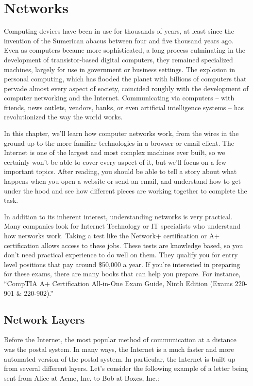 \chapter{Networks}

Computing devices have been in use for thousands of years, at least since the invention of the Sumerican abacus between four and five thousand years ago. Even as computers became more sophisticated, a long process culminating in the development of transistor-based digital computers, they remained specialized machines, largely for use in government or business settings. The explosion in personal computing, which has flooded the planet with billions of computers that pervade almost every aspect of society, coincided roughly with the development of computer networking and the Internet. Communicating via computers -- with friends, news outlets, vendors, banks, or even artificial intelligence systems -- has revolutionized the way the world works.

In this chapter, we'll learn how computer networks work, from the wires in the ground up to the more familiar technologies in a browser or email client. The Internet is one of the largest and most complex machines ever built, so we certainly won't be able to cover every aspect of it, but we'll focus on a few important topics. After reading, you should be able to tell a story about what happens when you open a website or send an email, and understand how to get under the hood and see how different pieces are working together to complete the task.

In addition to its inherent interest, understanding networks is very practical. Many companies look for Internet Technology or IT specialists who understand how networks work. Taking a test like the Network+ certification or A+ certification allows access to these jobs. These tests are knowledge based, so you don’t need practical experience to do well on them. They qualify you for entry level positions that pay around \$50,000 a year. If you're interested in preparing for these exams, there are many books that can help you prepare. For instance, ``CompTIA A+ Certification All-in-One Exam Guide, Ninth Edition (Exams 220-901 \& 220-902).''

\section{Network Layers}\label{sec:network:layers}

Before the Internet, the most popular method of communication at a distance was the postal system. In many ways, the Internet is a much faster and more automated version of the postal system. In particular, the Internet is built up from several different layers. Let's consider the following example of a letter being sent from Alice at Acme, Inc. to Bob at Boxes, Inc.:

